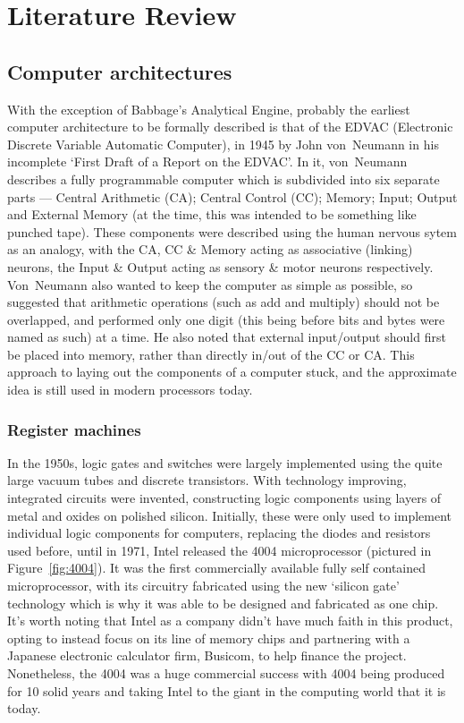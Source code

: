 \chapter{Literature Review}\label{ch:litreview}
\section{Computer architectures}
With the exception of Babbage's Analytical Engine, probably the earliest
computer architecture to be formally described is that of the EDVAC (Electronic
Discrete Variable Automatic Computer), in 1945 by John von~Neumann in his
incomplete `First Draft of a Report on the EDVAC'. In it, von~Neumann describes
a fully programmable computer which is subdivided into six separate parts ---
Central Arithmetic (CA); Central Control (CC); Memory; Input; Output and
External Memory (at the time, this was intended to be something like punched
tape). These components were described using the human nervous sytem as an
analogy, with the CA, CC \& Memory acting as associative (linking) neurons, the
Input \& Output acting as sensory \& motor neurons respectively.
Von~Neumann also wanted to keep the computer as simple as possible, so suggested
that arithmetic operations (such as add and multiply) should not be overlapped,
and performed only one digit (this being before bits and bytes were named as
such) at a time. He also noted that external input/output should first be placed
into memory, rather than directly in/out of the CC or CA\@. This approach to
laying out the components of a computer stuck, and the approximate idea is still
used in modern processors today.\cite{FirstDraft}

\subsection{Register machines}
In the 1950s, logic gates and switches were largely implemented using the quite
large vacuum tubes and discrete transistors. With technology improving,
integrated circuits were invented, constructing logic components using layers of
metal and oxides on polished silicon. Initially, these were only used to
implement individual logic components for computers, replacing the diodes and
resistors used before, until in 1971, Intel released the 4004 microprocessor
(pictured in Figure~\ref{fig:4004}).
It was the first commercially available fully self contained microprocessor,
with its circuitry fabricated using the new `silicon gate' technology which is
why it was able to be designed and fabricated as one chip. It's worth noting
that Intel as a company didn't have much faith in this product, opting to
instead focus on its line of memory chips and partnering with a Japanese
electronic calculator firm, Busicom, to help finance the project. Nonetheless,
the 4004 was a huge commercial success with 4004 being produced for 10 solid
years and taking Intel to the giant in the computing world that it is
today.\cite{Aspray1997Intel}

